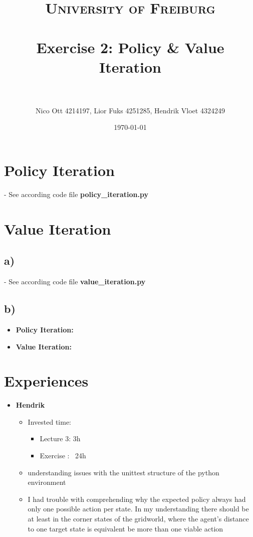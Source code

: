 \documentclass[paper=a4, fontsize=11pt]{scrartcl} %
\title{	
\normalfont \normalsize 
\textsc{University of Freiburg} \\ [25pt] %
\horrule{0.5pt} \\[0.4cm] %
\huge Exercise 2: Policy \& Value Iteration \\ %
\horrule{2pt} \\[0.5cm] %
}
\author{Nico Ott 4214197, Lior Fuks 4251285, Hendrik Vloet 4324249}
\date{\normalsize\today} %
\numberwithin{equation}{section} %
\numberwithin{figure}{section} %
\numberwithin{table}{section} %
\begin{document}
\maketitle %

\section{Policy Iteration}
- See according code file \textbf{policy\_iteration.py}


\section{Value Iteration}
\subsection*{a)}
- See according code file \textbf{value\_iteration.py}
\subsection*{b)}

\begin{itemize}
	\item \textbf{Policy Iteration:}\\
	
	\item \textbf{Value Iteration:}\\
\end{itemize}

\clearpage
\section{Experiences}
\begin{itemize}
	\item \textbf{Hendrik}
	\begin{itemize}
		\item Invested time:
		\begin{itemize}
			\item Lecture 3: 3h
			\item Exercise : ~24h
		\end{itemize}
		\item understanding issues with the unittest structure of the python environment
		\item I had trouble with comprehending why the expected policy always had only one possible action per state. In my understanding there should be at least in the corner states of the gridworld, where the agent's distance to one target state is equivalent be more than one viable action
	\end{itemize}
\end{itemize}
	
\end{document}

